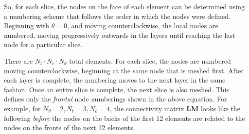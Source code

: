 \documentclass[10pt]{article}
\begin{document}
So, for each slice, the nodes on the face of each element can be determined using a numbering scheme that follows the order in which the nodes were defined. Beginning with \(\theta=0\), and moving counterclockwise, the local nodes are numbered, moving progressively outwards in the layers until reaching the last node for a particular slice. 

There are \(N_t\cdot N_c\cdot N_\theta\) total elements. For each slice, the nodes are numbered moving counterclockwise, beginning at the same node that is meshed first. After each layer is complete, the numbering moves to the next layer in the same fashion. Once an entire slice is complete, the next slice is also meshed. This defines only the \textit{frontal} node numberings shown in the above equation. For example, for \(N_\theta=2, N_t=3, N_c=4\), the connectivity matrix \(\textbf{LM}\) looks like the following \textit{before} the nodes on the backs of the first 12 elements are related to the nodes on the fronts of the next 12 elements.
\end{document}
